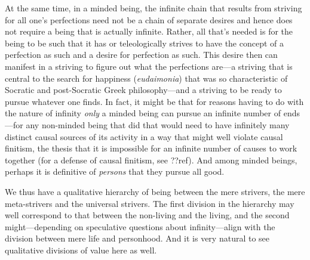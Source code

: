 At the same time, in a minded being, the infinite chain that results from striving for all one's perfections need not be a chain of separate desires
and hence does not require a being that is actually infinite. Rather, all that's needed is for the being to be such that it has or teleologically strives
to have the concept of a perfection as such and a desire for perfection as such. This desire then can manifest in a striving to figure out what the perfections are---a striving that is central to
the search for happiness (\textit{eudaimonia}) that was so characteristic of Socratic and post-Socratic Greek philosophy---and a striving to be ready
to pursue whatever one finds. In fact, it might be that for reasons having to do with the nature of infinity \textit{only} a minded being can pursue
an infinite number of ends---for any non-minded being that did that would need to have infinitely many distinct causal sources of its activity in
a way that might well violate causal finitism, the thesis that it is impossible for an infinite number of causes to work together (for a defense
of causal finitism, see ??ref). And among minded beings, perhaps it is definitive of \textit{persons} that they pursue all good.

We thus have a qualitative hierarchy of being between the mere strivers, the mere meta-strivers and the universal strivers. The first division in
the hierarchy may well correspond to that between the non-living and the living, and the second might---depending on speculative questions about
infinity---align with the division between mere life and personhood. And it is very natural to see qualitative divisions of value here as well.



